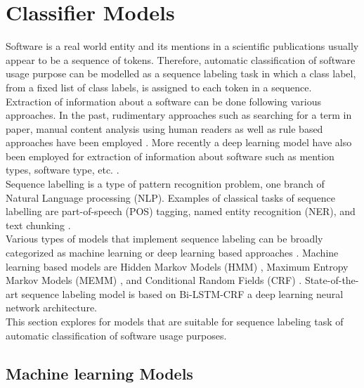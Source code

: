 \chapter{Classifier Models}
\label{ch:chapter04}
 
%
%

Software is a real world entity and its mentions in a scientific publications usually appear to be a sequence of tokens.  Therefore, automatic classification of software usage purpose can be modelled as a sequence labeling task in which a class label, from a fixed list of class labels, is assigned to each token in a sequence. \\

Extraction of information about a software can be done following various approaches. In the past, rudimentary approaches such as searching for a term in paper, manual content analysis using human readers as well as rule based approaches have been employed \citep{kruger2019literature}.  More recently a deep learning model have also been employed for extraction of  information about software such as mention types, software type, etc. \citep{schindler2022role}. \\

Sequence labelling is a type of pattern recognition problem, one branch of Natural Language processing (NLP). Examples of classical tasks of sequence labelling are part-of-speech (POS) tagging, named entity recognition (NER), and text chunking \citep{akhundov2018sequence, he2020survey}.  \\

Various types of models that implement sequence labeling can be broadly categorized as machine learning or deep learning based approaches \citep{he2020survey}. Machine learning based models are Hidden Markov Models (HMM) \citep{kupiec1992robust}, Maximum Entropy Markov Models (MEMM) \citep{mccallum2000maximum}, and Conditional Random Fields (CRF) \citep{lafferty2001conditional}.  State-of-the-art sequence labeling model is based on Bi-LSTM-CRF a deep learning neural network architecture. \\

This section explores for models that are suitable for sequence labeling task of automatic classification of software usage purposes. 

\section{Machine learning Models}
\label{sec:chapter05:MLModels}

